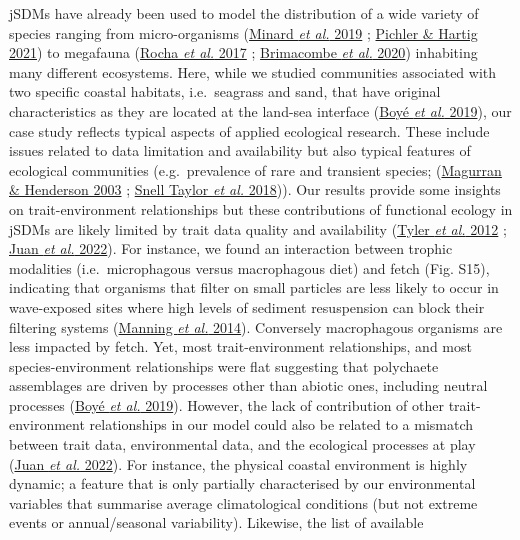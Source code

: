 \documentclass[9pt,biorxiv,doublespacing,lineno]{lapreprint}
\begin{document}
jSDMs have already been used to model the distribution of a wide variety
of species ranging from micro-organisms
(\protect\hyperlink{ref-Minard_2019}{Minard \emph{et al.} 2019} ;
\protect\hyperlink{ref-Pichler_2021}{Pichler \& Hartig 2021}) to
megafauna (\protect\hyperlink{ref-Rocha_2017}{Rocha \emph{et al.} 2017}
; \protect\hyperlink{ref-Brimacombe_2020}{Brimacombe \emph{et al.}
2020}) inhabiting many different ecosystems. Here, while we studied
communities associated with two specific coastal habitats, i.e.~seagrass
and sand, that have original characteristics as they are located at the
land-sea interface (\protect\hyperlink{ref-Boye_2019a}{Boyé \emph{et
al.} 2019}), our case study reflects typical aspects of applied
ecological research. These include issues related to data limitation and
availability but also typical features of ecological communities
(e.g.~prevalence of rare and transient species;
(\protect\hyperlink{ref-Magurran_2003}{Magurran \& Henderson 2003} ;
\protect\hyperlink{ref-SnellTaylor_2018}{Snell Taylor \emph{et al.}
2018})). Our results provide some insights on trait-environment
relationships but these contributions of functional ecology in jSDMs are
likely limited by trait data quality and availability
(\protect\hyperlink{ref-Tyler_2012}{Tyler \emph{et al.} 2012} ;
\protect\hyperlink{ref-deJuan_2022}{Juan \emph{et al.} 2022}). For
instance, we found an interaction between trophic modalities
(i.e.~microphagous versus macrophagous diet) and fetch (Fig. S15),
indicating that organisms that filter on small particles are less likely
to occur in wave-exposed sites where high levels of sediment
resuspension can block their filtering systems
(\protect\hyperlink{ref-Manning_2014}{Manning \emph{et al.} 2014}).
Conversely macrophagous organisms are less impacted by fetch. Yet, most
trait-environment relationships, and most species-environment
relationships were flat suggesting that polychaete assemblages are
driven by processes other than abiotic ones, including neutral processes
(\protect\hyperlink{ref-Boye_2019a}{Boyé \emph{et al.} 2019}). However,
the lack of contribution of other trait-environment relationships in our
model could also be related to a mismatch between trait data,
environmental data, and the ecological processes at play
(\protect\hyperlink{ref-deJuan_2022}{Juan \emph{et al.} 2022}). For
instance, the physical coastal environment is highly dynamic; a feature
that is only partially characterised by our environmental variables that
summarise average climatological conditions (but not extreme events or
annual/seasonal variability). Likewise, the list of available
\end{document}
